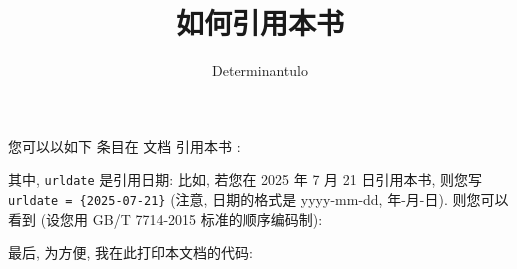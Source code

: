 \documentclass[zihao=-4]{ctexart}
\begin{document}
\frenchspacing
\renewcommand*{\UrlFont}{\ttfamily}

\title{如何引用本书}
\author{Determinantulo}
\date{}
\maketitle

\thispagestyle{empty}

您可以以如下  条目在  文档%
引用本书 \cite{Determinantulo:EaD}:

其中, \lstinline[]`urldate` 是引用日期:
比如, 若您在 2025 年 7 月 21 日引用本书, 则您写
\lstinline[]`urldate = {2025-07-21}`
(注意, 日期的格式是 yyyy-mm-dd, 年-月-日).
则您可以看到 (设您用 GB/T 7714-2015 标准的顺序编码制):
\printbibliography

最后, 为方便, 我在此打印本文档的代码:

\end{document}

